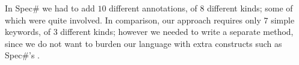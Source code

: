 In Spec\# we had to add $10$ different annotations, of $8$ different kinds; some of which were quite involved. In comparison, our approach requires only $7$ simple keywords, of $3$ different kinds; however we needed to write 
a separate \Q@moveTo@ method, since we do not want to burden our language with extra constructs such as Spec\#'s \Q@expose@.

